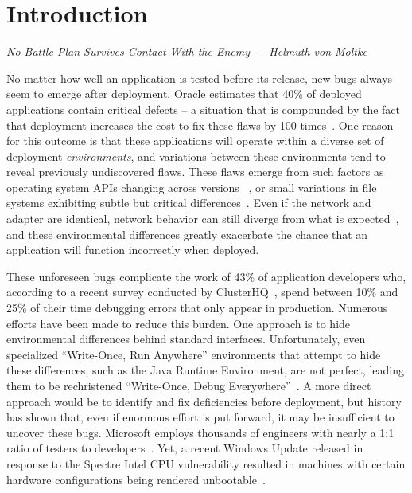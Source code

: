 \section{Introduction}
\label{SEC:introduction}
\textit{No Battle Plan Survives Contact With the Enemy --- Helmuth von Moltke}

No matter how well an application is tested before its release,
new bugs always seem to emerge after deployment.
Oracle estimates that 40\% of deployed applications
contain critical defects -- a situation that is compounded
by the fact that deployment
increases the cost to fix these flaws by 100 times~\cite{OracleAppQuality}.
One reason for this outcome
is that these applications will operate within a diverse set of
deployment \emph{environments},
and variations between these environments tend to
reveal previously undiscovered flaws.
These flaws emerge from
such factors as
operating system APIs changing across versions
~\cite{LinuxGlibcChanges, WinAPICompat, MuslDifferences},
or small variations in file systems exhibiting subtle but critical
differences~\cite{EXT4Layout, AppleHFS, WindowsNTFS}.
Even if the network and adapter are identical,
network behavior can still diverge from what is expected~\cite{vbox,
NMAPOSDifferences, VMWareNATFailure},
and these environmental differences greatly exacerbate
the chance that an application will function incorrectly when deployed.

These unforeseen bugs
complicate the work of 43\% of application developers who, according to a
recent survey conducted by ClusterHQ~\cite{ClusterHQSurvey},
spend between 10\% and 25\% of their time
debugging errors that only appear in production.
Numerous efforts have been made to reduce this burden.
One approach
is to hide environmental differences behind standard interfaces.
Unfortunately,
even specialized ``Write-Once, Run Anywhere'' environments
that attempt to hide these differences,
such as the Java Runtime Environment,
are not perfect,
leading them to be rechristened ``Write-Once, Debug Everywhere''~\cite{WODE}.
A more direct approach would be
to identify and fix deficiencies before deployment,
but history has shown that,
even if enormous effort is put forward,
it may be insufficient to uncover these bugs.
Microsoft employs thousands of engineers with nearly a
1:1 ratio of testers to developers~\cite{Page2009}.
Yet, a recent Windows Update released
in response to the Spectre Intel CPU vulnerability
resulted in machines with certain hardware configurations
being rendered unbootable~\cite{kb4056892}.

